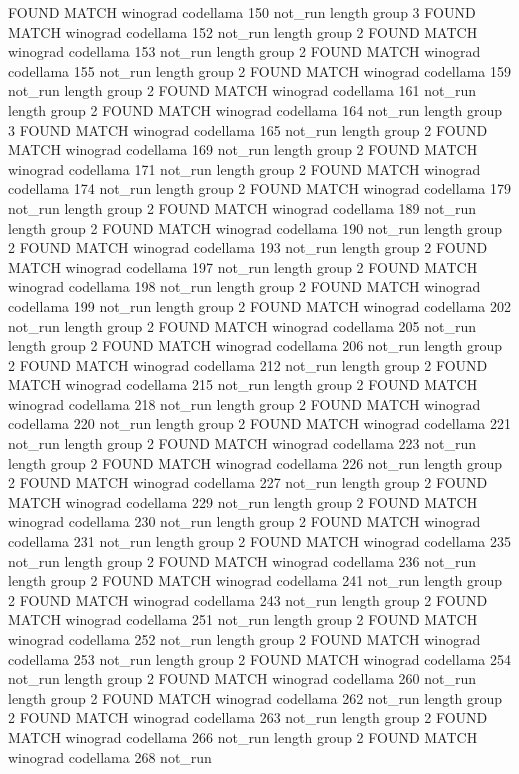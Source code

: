 FOUND MATCH winograd codellama 150 not_run
length group  3
FOUND MATCH winograd codellama 152 not_run
length group  2
FOUND MATCH winograd codellama 153 not_run
length group  2
FOUND MATCH winograd codellama 155 not_run
length group  2
FOUND MATCH winograd codellama 159 not_run
length group  2
FOUND MATCH winograd codellama 161 not_run
length group  2
FOUND MATCH winograd codellama 164 not_run
length group  3
FOUND MATCH winograd codellama 165 not_run
length group  2
FOUND MATCH winograd codellama 169 not_run
length group  2
FOUND MATCH winograd codellama 171 not_run
length group  2
FOUND MATCH winograd codellama 174 not_run
length group  2
FOUND MATCH winograd codellama 179 not_run
length group  2
FOUND MATCH winograd codellama 189 not_run
length group  2
FOUND MATCH winograd codellama 190 not_run
length group  2
FOUND MATCH winograd codellama 193 not_run
length group  2
FOUND MATCH winograd codellama 197 not_run
length group  2
FOUND MATCH winograd codellama 198 not_run
length group  2
FOUND MATCH winograd codellama 199 not_run
length group  2
FOUND MATCH winograd codellama 202 not_run
length group  2
FOUND MATCH winograd codellama 205 not_run
length group  2
FOUND MATCH winograd codellama 206 not_run
length group  2
FOUND MATCH winograd codellama 212 not_run
length group  2
FOUND MATCH winograd codellama 215 not_run
length group  2
FOUND MATCH winograd codellama 218 not_run
length group  2
FOUND MATCH winograd codellama 220 not_run
length group  2
FOUND MATCH winograd codellama 221 not_run
length group  2
FOUND MATCH winograd codellama 223 not_run
length group  2
FOUND MATCH winograd codellama 226 not_run
length group  2
FOUND MATCH winograd codellama 227 not_run
length group  2
FOUND MATCH winograd codellama 229 not_run
length group  2
FOUND MATCH winograd codellama 230 not_run
length group  2
FOUND MATCH winograd codellama 231 not_run
length group  2
FOUND MATCH winograd codellama 235 not_run
length group  2
FOUND MATCH winograd codellama 236 not_run
length group  2
FOUND MATCH winograd codellama 241 not_run
length group  2
FOUND MATCH winograd codellama 243 not_run
length group  2
FOUND MATCH winograd codellama 251 not_run
length group  2
FOUND MATCH winograd codellama 252 not_run
length group  2
FOUND MATCH winograd codellama 253 not_run
length group  2
FOUND MATCH winograd codellama 254 not_run
length group  2
FOUND MATCH winograd codellama 260 not_run
length group  2
FOUND MATCH winograd codellama 262 not_run
length group  2
FOUND MATCH winograd codellama 263 not_run
length group  2
FOUND MATCH winograd codellama 266 not_run
length group  2
FOUND MATCH winograd codellama 268 not_run
